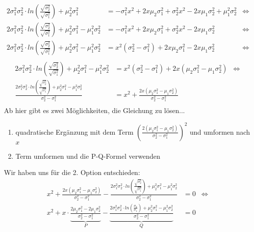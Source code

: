 \documentclass[12pt]{article}
\begin{document}
\begin{align*}
2 \sigma_1^2 \sigma_2^2 \cdot ln \left(\frac{\sqrt{\sigma_2^2}}{\sqrt{\sigma_1^2}}\right) + \mu_2^2\sigma_1^2 &= -\sigma_1^2x^2 +2x\mu_2\sigma_1^2 + \sigma_2^2 x^2 -2x\mu_1\sigma_2^2 + \mu_1^2\sigma_2^2 &\Leftrightarrow\\
2 \sigma_1^2 \sigma_2^2 \cdot ln \left(\frac{\sqrt{\sigma_2^2}}{\sqrt{\sigma_1^2}}\right) + \mu_2^2\sigma_1^2 - \mu_1^2\sigma_2^2&= -\sigma_1^2x^2 +2x\mu_2\sigma_1^2 + \sigma_2^2 x^2 -2x\mu_1\sigma_2^2 &\Leftrightarrow\\
2 \sigma_1^2 \sigma_2^2 \cdot ln \left(\frac{\sqrt{\sigma_2^2}}{\sqrt{\sigma_1^2}}\right) + \mu_2^2\sigma_1^2 - \mu_1^2\sigma_2^2&= x^2 (\sigma_2^2-\sigma_1^2) +2x\mu_2\sigma_1^2 -2x\mu_1\sigma_2^2 &\Leftrightarrow\\
\end{align*}
\newpage
\begin{align*}
2 \sigma_1^2 \sigma_2^2 \cdot ln \left(\frac{\sqrt{\sigma_2^2}}{\sqrt{\sigma_1^2}}\right) + \mu_2^2\sigma_1^2 - \mu_1^2\sigma_2^2&= x^2 (\sigma_2^2-\sigma_1^2) + 2x (\mu_2\sigma_1^2 - \mu_1\sigma_2^2) &\Leftrightarrow\\
\frac{2 \sigma_1^2 \sigma_2^2 \cdot ln \left(\frac{\sqrt{\sigma_2^2}}{\sqrt{\sigma_1^2}}\right) + \mu_2^2\sigma_1^2 - \mu_1^2\sigma_2^2}{\sigma_2^2-\sigma_1^2} &= x^2 + \frac{2x(\mu_2\sigma_1^2 - \mu_1\sigma_2^2)}{\sigma_2^2-\sigma_1^2}\\
\end{align*}
Ab hier gibt es zwei M\"oglichkeiten, die Gleichung zu l\"osen...
\begin{enumerate}
\item quadratische Erg\"anzung mit dem Term $\left(\frac{2(\mu_2\sigma_1^2 - \mu_1\sigma_2^2)}{\sigma_2^2-\sigma_1^2}\right)^2$ und umformen nach $x$
\item Term umformen und die P-Q-Formel verwenden
\end{enumerate}
Wir haben uns f\"ur die 2. Option entschieden:
\begin{align*}
x^2 + \frac{2x(\mu_2\sigma_1^2 - \mu_1\sigma_2^2)}{\sigma_2^2-\sigma_1^2} - \frac{2 \sigma_1^2 \sigma_2^2 \cdot ln \left(\frac{\sqrt{\sigma_2^2}}{\sqrt{\sigma_1^2}}\right) + \mu_2^2\sigma_1^2 - \mu_1^2\sigma_2^2}{\sigma_2^2-\sigma_1^2} &= 0 &\Leftrightarrow\\
x^2 + x \cdot \underbrace{\frac{2\mu_2\sigma_1^2 - 2\mu_1\sigma_2^2}{\sigma_2^2-\sigma_1^2}}_{P} - \underbrace{\frac{2 \sigma_1^2 \sigma_2^2 \cdot ln \left(\frac{\sigma_2}{\sigma_1}\right) + \mu_2^2\sigma_1^2 - \mu_1^2\sigma_2^2}{\sigma_2^2-\sigma_1^2}}_{Q} &= 0\\
\end{align*}
\end{document}
